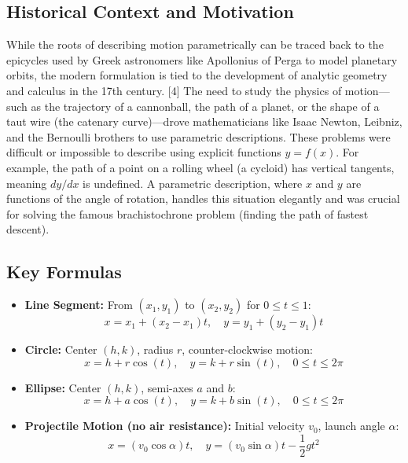 \documentclass{article}
\begin{document}
\subsection{Historical Context and Motivation}
While the roots of describing motion parametrically can be traced back to the epicycles used by Greek astronomers like Apollonius of Perga to model planetary orbits, the modern formulation is tied to the development of analytic geometry and calculus in the 17th century. [4] The need to study the physics of motion—such as the trajectory of a cannonball, the path of a planet, or the shape of a taut wire (the catenary curve)—drove mathematicians like Isaac Newton, Leibniz, and the Bernoulli brothers to use parametric descriptions. These problems were difficult or impossible to describe using explicit functions \(y = f(x)\). For example, the path of a point on a rolling wheel (a cycloid) has vertical tangents, meaning \(dy/dx\) is undefined. A parametric description, where \(x\) and \(y\) are functions of the angle of rotation, handles this situation elegantly and was crucial for solving the famous brachistochrone problem (finding the path of fastest descent).

\subsection{Key Formulas}
\begin{itemize}
    \item \textbf{Line Segment:} From \((x_1, y_1)\) to \((x_2, y_2)\) for \(0 \le t \le 1\):
    \[ x = x_1 + (x_2 - x_1)t, \quad y = y_1 + (y_2 - y_1)t \]
    \item \textbf{Circle:} Center \((h, k)\), radius \(r\), counter-clockwise motion:
    \[ x = h + r\cos(t), \quad y = k + r\sin(t), \quad 0 \le t \le 2\pi \]
    \item \textbf{Ellipse:} Center \((h, k)\), semi-axes \(a\) and \(b\):
    \[ x = h + a\cos(t), \quad y = k + b\sin(t), \quad 0 \le t \le 2\pi \]
    \item \textbf{Projectile Motion (no air resistance):} Initial velocity \(v_0\), launch angle \(\alpha\):
    \[ x = (v_0 \cos\alpha)t, \quad y = (v_0 \sin\alpha)t - \frac{1}{2}gt^2 \]
\end{itemize}
\end{document}
